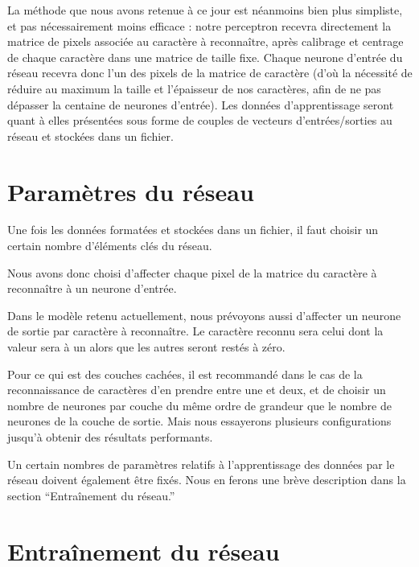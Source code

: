 La m\'ethode que nous avons retenue \`a ce jour est n\'eanmoins bien
plus simpliste, et pas n\'ecessairement moins efficace : notre
perceptron recevra directement la matrice de pixels associ\'ee au
caract\`ere \`a reconna\^itre, apr\`es calibrage et centrage de chaque
caract\`ere dans une matrice de taille fixe.
Chaque neurone d'entr\'ee du r\'eseau recevra donc l'un des pixels de la
matrice de caract\`ere (d'o\`u la n\'ecessit\'e de r\'eduire au maximum
la taille et l'\'epaisseur de nos caract\`eres, afin de ne pas
d\'epasser la centaine de neurones d'entr\'ee).
Les donn\'ees d'apprentissage seront quant \`a elles pr\'esent\'ees sous
forme de couples de vecteurs d'entr\'ees/sorties au r\'eseau et
stock\'ees dans un fichier.



\section{Param\`etres du r\'eseau} %
\label{subsec:choix_des_parametres_du_reseau}

Une fois les donn\'ees format\'ees et stock\'ees dans un fichier, il
faut choisir un certain nombre d'éléments clés du réseau.

Nous avons donc choisi d'affecter chaque pixel de la matrice du
caract\`ere \`a reconna\^itre \`a un neurone d'entr\'ee.

Dans le mod\`ele retenu actuellement, nous pr\'evoyons aussi d'affecter
un neurone de sortie par caract\`ere \`a reconna\^itre. Le caract\`ere
reconnu sera celui dont la valeur sera \`a un alors que les autres seront
rest\'es \`a z\'ero.

Pour ce qui est des couches cach\'ees, il est recommand\'e dans le cas
de la reconnaissance de caract\`eres d'en prendre entre une et deux, et
de choisir un nombre de neurones par couche du m\^eme ordre de grandeur
que le nombre de neurones de la couche de sortie. Mais nous essayerons
plusieurs configurations jusqu'\`a obtenir des r\'esultats
performants.

Un certain nombres de param\`etres relatifs \`a l'apprentissage des
donn\'ees par le r\'eseau doivent \'egalement \^etre fix\'es. Nous en
ferons une br\`eve description dans la section ``Entra\^inement du r\'eseau.''


\section{Entra\^inement du r\'eseau} %
\label{subsec:entrainement_du_reseau}

